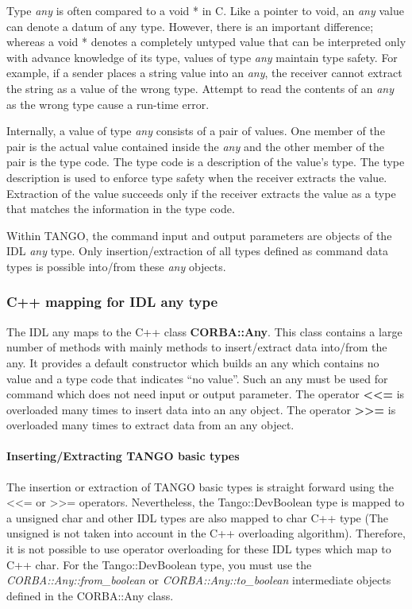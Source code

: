 Type \emph{any} is often compared to a void {*} in C. Like a pointer
to void, an \emph{any} value can denote a datum of any type. However,
there is an important difference; whereas a void {*} denotes a completely
untyped value that can be interpreted only with advance knowledge
of its type, values of type \emph{any} maintain type safety. For example,
if a sender places a string value into an \emph{any}, the receiver
cannot extract the string as a value of the wrong type. Attempt to
read the contents of an \emph{any} as the wrong type cause a run-time
error.

Internally, a value of type \emph{any} consists of a pair of values.
One member of the pair is the actual value contained inside the \emph{any}
and the other member of the pair is the type code. The type code is
a description of the value's type. The type description is used to
enforce type safety when the receiver extracts the value. Extraction
of the value succeeds only if the receiver extracts the value as a
type that matches the information in the type code.

Within TANGO, the command input and output parameters are objects
of the IDL \emph{any} type. Only insertion/extraction of all types
defined as command data types is possible into/from these \emph{any}
objects.


\subsubsection{C++ mapping for IDL any type}

The IDL any maps to the C++ class \textbf{CORBA::Any}.
This class contains a large number of methods with mainly methods
to insert/extract data into/from the any. It provides a default constructor
which builds an any which contains no value and a type code that indicates
``no value''. Such an any must be used for command which does not
need input or output parameter. The operator \textbf{<\textcompwordmark{}<=}
is overloaded many times to insert data into an any object. The operator
\textbf{>\textcompwordmark{}>=} is overloaded many times to extract
data from an any object.


\paragraph{Inserting/Extracting TANGO basic types}

The insertion or extraction of TANGO basic types is straight forward
using the <\textcompwordmark{}<= or >\textcompwordmark{}>= operators.
Nevertheless, the Tango::DevBoolean type is mapped to a unsigned char
and other IDL types are also mapped to char C++ type (The unsigned
is not taken into account in the C++ overloading algorithm). Therefore,
it is not possible to use operator overloading for these IDL types
which map to C++ char. For the Tango::DevBoolean type, you must use
the \emph{CORBA::Any::from\_boolean} or \emph{CORBA::Any::to\_boolean}
intermediate objects defined in the CORBA::Any class.


